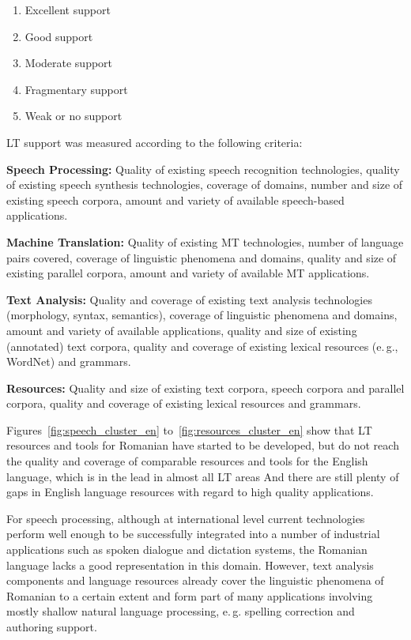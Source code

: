 \documentclass[]{../../metanetpaper}
\begin{document}
\begin{multicols}{2}
\begin{enumerate}
\item Excellent support
\item Good support
\item Moderate support
\item Fragmentary support
\item Weak or no support
\end{enumerate}

LT support was measured according to the following criteria:

\textbf{Speech Processing:} Quality of existing speech recognition technologies, quality of existing speech synthesis technologies, coverage of domains, number and size of existing speech corpora, amount and variety of available speech-based applications.

\textbf{Machine Translation:} Quality of existing MT technologies, number of language pairs covered, coverage of linguistic phenomena and domains, quality and size of existing parallel corpora, amount and variety of available MT applications.

\textbf{Text Analysis:} Quality and coverage of existing text analysis technologies (morphology, syntax, semantics), coverage of linguistic phenomena and domains, amount and variety of available applications, quality and size of existing (annotated) text corpora, quality and coverage of existing lexical resources (e.\,g., WordNet) and grammars.

\textbf{Resources:} Quality and size of existing text corpora, speech corpora and parallel corpora, quality and coverage of existing lexical resources and grammars.

Figures~\ref{fig:speech_cluster_en} to~\ref{fig:resources_cluster_en} show that LT resources and tools for Romanian have started to be developed, but do not reach the quality and coverage of comparable resources and tools for the English language, which is in the lead in almost all LT areas And there are still plenty of gaps in English language resources with regard to high quality applications.

For speech processing, although at international level current technologies perform well enough to be successfully integrated into a number of industrial applications such as spoken dialogue and dictation systems, the Romanian language lacks a good representation in this domain. However, text analysis components and language resources already cover the linguistic phenomena of Romanian to a certain extent and form part of many applications involving mostly shallow natural language processing, e.\,g. spelling correction and authoring support.


\end{multicols}
\end{document}
